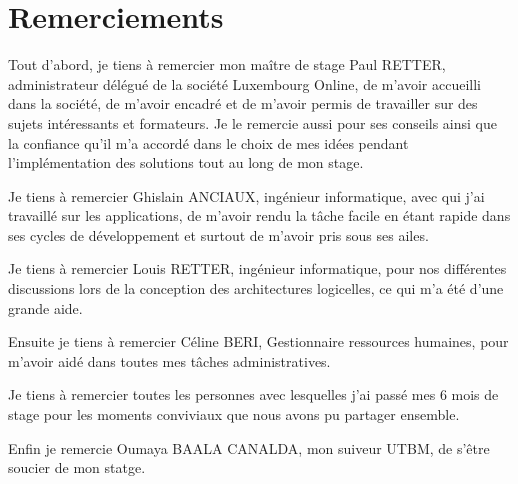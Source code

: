 \chapter*{Remerciements}
Tout d'abord, je tiens à remercier mon maître de stage Paul RETTER, administrateur délégué de la société Luxembourg Online, de m'avoir accueilli dans la société, de m'avoir encadré et de m'avoir permis de travailler sur des sujets intéressants et formateurs. Je le remercie aussi pour ses conseils ainsi que la confiance qu'il m'a accordé dans le choix de mes idées pendant l'implémentation des solutions tout au long de mon stage.

Je tiens à remercier Ghislain ANCIAUX, ingénieur informatique, avec qui j'ai travaillé sur les applications, de m'avoir rendu la tâche facile en étant rapide dans ses cycles de développement et surtout de m'avoir pris sous ses ailes.

Je tiens à remercier Louis RETTER, ingénieur informatique, pour nos différentes discussions lors de la conception des architectures logicelles, ce qui m'a été d'une grande aide.

Ensuite je tiens à remercier Céline BERI, Gestionnaire ressources humaines, pour m'avoir aidé dans toutes mes tâches administratives.

Je tiens à remercier toutes les personnes avec lesquelles j'ai passé mes 6 mois de stage pour les moments conviviaux que nous avons pu partager ensemble.

Enfin je remercie Oumaya BAALA CANALDA, mon suiveur UTBM, de s'être soucier de mon statge.